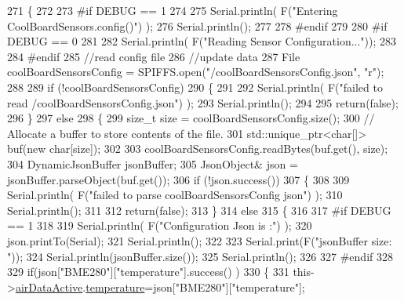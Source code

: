 \begin{DoxyCode}
271 \{
272 
273 \textcolor{preprocessor}{#if DEBUG == 1}
274 
275     Serial.println( F(\textcolor{stringliteral}{"Entering CoolBoardSensors.config()"}) );
276     Serial.println();
277 
278 \textcolor{preprocessor}{#endif}
279 
280 \textcolor{preprocessor}{#if DEBUG == 0}
281 
282     Serial.println( F(\textcolor{stringliteral}{"Reading Sensor Configuration..."}));
283 
284 \textcolor{preprocessor}{#endif}
285     \textcolor{comment}{//read config file}
286     \textcolor{comment}{//update data}
287     File coolBoardSensorsConfig = SPIFFS.open(\textcolor{stringliteral}{"/coolBoardSensorsConfig.json"}, \textcolor{stringliteral}{"r"});
288 
289     \textcolor{keywordflow}{if} (!coolBoardSensorsConfig) 
290     \{
291     
292         Serial.println( F(\textcolor{stringliteral}{"failed to read /coolBoardSensorsConfig.json"}) );
293         Serial.println();
294 
295         \textcolor{keywordflow}{return}(\textcolor{keyword}{false});
296     \}
297     \textcolor{keywordflow}{else}
298     \{
299         \textcolor{keywordtype}{size\_t} size = coolBoardSensorsConfig.size();
300         \textcolor{comment}{// Allocate a buffer to store contents of the file.}
301         std::unique\_ptr<char[]> buf(\textcolor{keyword}{new} \textcolor{keywordtype}{char}[size]);
302 
303         coolBoardSensorsConfig.readBytes(buf.get(), size);
304         DynamicJsonBuffer jsonBuffer;
305         JsonObject& json = jsonBuffer.parseObject(buf.get());
306         \textcolor{keywordflow}{if} (!json.success()) 
307         \{
308 
309             Serial.println( F(\textcolor{stringliteral}{"failed to parse coolBoardSensorsConfig json"}) );
310             Serial.println();
311     
312             \textcolor{keywordflow}{return}(\textcolor{keyword}{false});
313         \} 
314         \textcolor{keywordflow}{else}
315         \{
316 
317 \textcolor{preprocessor}{        #if DEBUG == 1}
318 
319             Serial.println( F(\textcolor{stringliteral}{"Configuration Json is :"}) );
320             json.printTo(Serial);
321             Serial.println();
322 
323             Serial.print(F(\textcolor{stringliteral}{"jsonBuffer size: "}));
324             Serial.println(jsonBuffer.size());
325             Serial.println();
326         
327 \textcolor{preprocessor}{        #endif}
328             
329             \textcolor{keywordflow}{if}(json[\textcolor{stringliteral}{"BME280"}][\textcolor{stringliteral}{"temperature"}].success() )
330             \{           
331                 this->\hyperlink{class_cool_board_sensors_abff8dfeccb2f7689847bb64d5f1cd31e}{airDataActive}.\hyperlink{struct_cool_board_sensors_1_1air_active_ac08576736c7ac3bfbfec32e5ee17c686}{temperature}=json[\textcolor{stringliteral}{"BME280"}][\textcolor{stringliteral}{"temperature"}];

\end{DoxyCode}
